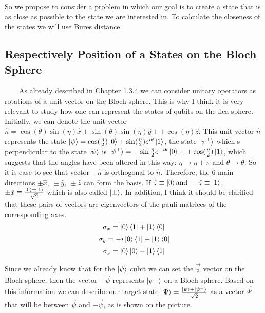 \documentclass[english,14pt,a4paper]{article}
\begin{document}
\begin{spacing}{1.5}
	So we propose to consider a problem in which our goal is to create a state that is as close as possible to the state we are interested in. To calculate the closeness of the states we will use Bures distance. 
	\subsection{Respectively Position of a States on the Bloch Sphere}\ \ \ \
	As already described in Chapter 1.3.4 we can consider unitary operators as rotations of a unit vector on the Bloch sphere. This is why I think it is very relevant to study how one can represent the states of qubits on the flea sphere. \\
	
	Initially, we can denote the unit vector $\hat{n} = \cos(\theta)\sin(\eta) \hat{x} + \sin(\theta)\sin(\eta)\hat{y} + +\cos(\eta)\hat{z}$. This unit vector $\hat{n}$ represents the state $\ket{\psi} = \cos(\frac{\eta }{2})\ket{0} + \sin(\frac{\eta}{2}) e^{i\theta}\ket{1}$, the state $\ket{\psi^{\perp}}$ which s perpendicular to the state $\ket{\psi}$ is $\ket{\psi^{\perp}} = -\sin{\frac{\eta}{2}}e^{-i\theta} \ket{0} ++ \cos(\frac{\eta}{2})\ket{1}$, which suggests that the angles have been altered in this way: $ \eta \rightarrow \eta + \pi $ and $ \theta \rightarrow \theta$. So it is ease to see that vector $-\hat{n}$ is orthogonal to $\hat{n}$. Therefore, the 6 main directions $\pm \hat{x}, \ \pm \hat{y}, \ \pm \hat{z}$ can form the basis. If $\hat{z} \equiv \ket{0} \text{and} \ -\hat{z} \equiv \ket{1}$, $\pm \hat{x} \equiv \frac{\ket{0} \pm \ket{1}}{\sqrt{2}}$ which is also called $\ket{\pm}$. In addition, I think it should be clarified that these pairs of vectors are eigenvectors of the pauli matrices of the corresponding axes. 
	\[
	\sigma_x = \ket{0}\bra{1} + \ket{1}\bra{0}
	\]
	\[
	\sigma_y = -i\ket{0}\bra{1} + \ket{1}\bra{0}
	\]
	\[
	\sigma_z = \ket{0}\ket{0} - \ket{1}\bra{1}
	\]
	
	Since we already know that for the $\ket{\psi}$ cubit we can set the $\vec{\psi}$ vector on the Bloch sphere, then the vector $-\vec{\psi}$ represents $\ket{\psi^{\perp}}$ on a Bloch sphere. Based on this information we can describe our target state $\ket{\Psi} = \frac{\ket{\psi} + \ket{\psi^{\perp}}}{\sqrt{2}}$ as a vector $\vec{\Psi}$ that will be between $\vec{\psi}$ and $-\vec{\psi}$, as is shown on the picture. 
	\begin{figure}[!htbp] %
		\centering
\end{figure}
\end{spacing}
\end{document}
